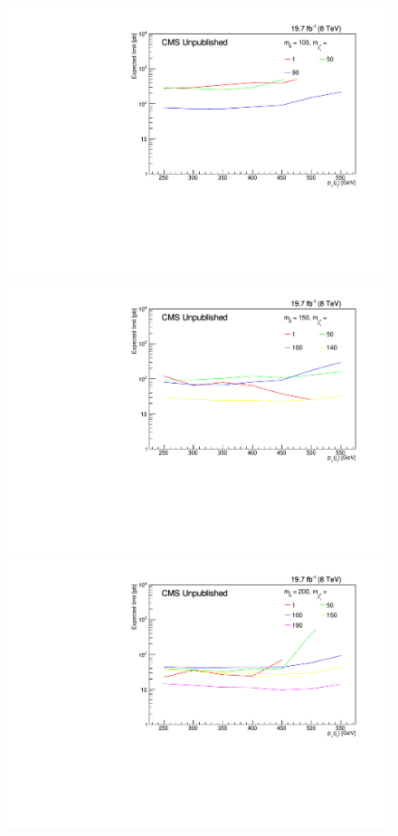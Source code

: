 \begin{figure}[!Hhtb]
  \begin{center}
  \includegraphics[scale=0.35]{Figures/sus13009/limitplots/plots/sbottom/expected_100.pdf}
  \includegraphics[scale=0.35]{Figures/sus13009/limitplots/plots/sbottom/expected_150.pdf}
  \includegraphics[scale=0.35]{Figures/sus13009/limitplots/plots/sbottom/expected_200.pdf} 

\end{center}
\end{figure}
